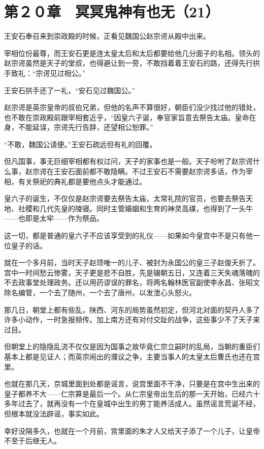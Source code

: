 \section{第２０章　冥冥鬼神有也无（21）}

王安石奉召来到崇政殿的时候，正看见魏国公赵宗谔从殿中出来。

宰相位份最尊，而王安石更是连太皇太后和太后都要给他几分面子的名相。领头的赵宗谔虽然是天子的堂叔，也得避让到一旁，不敢挡着着王安石的路，还得先行拱手致礼：“宗谔见过相公。”

王安石拱手还了一礼，“安石见过魏国公。”

赵宗谔是英宗皇帝的叔伯兄弟，但他的名声不算很好，朝臣们没少找过他的错处，也不敢在崇政殿前跟宰相套近乎，“因皇六子诞，奉官家旨意去祭告太庙。皇命在身，不能延误，宗谔先行告辞，还望相公恕罪。”

“不敢，魏国公请便。”王安石疏远但有礼的回覆。

但凡国事，事无巨细宰相都有权过问，天子的家事也是一般。天子吩咐了赵宗谔什么事，赵宗谔在王安石面前都不敢隐瞒。不过王安石不需要赵宗谔多话，作为宰相，有关祭祀的典礼都是要他点头才能通过。

皇六子的诞生，不仅仅是赵宗谔要去祭告太庙，太常礼院的官员，也要去祭告天地、社稷和几代先皇的陵寝。同时主管婚姻和生育的神灵高禖，也得到了一头牛——也即是太牢——作为祭品。

这一切，都是普通的皇六子不应该享受到的礼仪——如果如今皇宫中不是只有他一位皇子的话。

就在一个多月前，当时天子赵顼唯一的儿子、被封为永国公的皇三子赵俊夭折了。宫中一时间愁云惨雾，天子更是悲不自胜，先是辍朝五日，又连着三天失魂落魄的不去政事堂处理政务。还以用药谬误的罪名，将两名翰林医官副使李永昌、张昭文除名编管，一个去了随州，一个去了唐州，以发泄心头怒火。

那几日，朝堂上都有些乱，陕西、河东的局势虽然初定，但河北对面的契丹人多了许多小动作，一时急报频传。加上南方还有对付交趾的战争，这些事少不了天子来过目。

但朝堂上的隐隐乱流不仅仅是因为国事之故毕竟仁宗立嗣时的乱局，当朝的重臣们基本上都是见证人；而英宗闹出的濮议之争，主要当事人的太皇太后曹氏也还在宫里。

也就在那几天，京城里面到处都是谣言，说宫里面不干净，只要是在宫中生出来的皇子都养不大——仁宗算是最后一个。从仁宗皇帝出生后的那一天开始，已经六十多年过去了，就再没有一个在皇城中出生的男丁能养活成人。虽然谣言荒诞不经，但根本就没法辟谣，事实如此。

幸好没隔多久，也就在一个月前，宫里面的朱才人又给天子添了一个儿子，让皇帝不至于后继无人。

